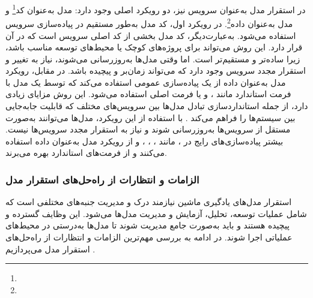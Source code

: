 در استقرار مدل به‌عنوان سرویس نیز، دو رویکرد اصلی وجود دارد: مدل به‌عنوان کد\footnote{} و مدل به‌عنوان داده\footnote{}. در رویکرد اول، کد مدل به‌طور مستقیم در پیاده‌سازی سرویس استفاده می‌شود. به‌عبارت‌دیگر، کد مدل بخشی از کد اصلی سرویس است که در آن قرار دارد. این روش می‌تواند برای پروژه‌های کوچک یا محیط‌های توسعه مناسب باشد، زیرا ساده‌تر و مستقیم‌تر است. اما وقتی مدل‌ها به‌روزرسانی می‌شوند، نیاز به تغییر و استقرار مجدد سرویس وجود دارد که می‌تواند زمان‌بر و پیچیده باشد. در مقابل، رویکرد مدل به‌عنوان داده از یک پیاده‌سازی عمومی استفاده می‌کند که توسط یک مدل با فرمت استاندارد مانند ،  و یا فرمت اصلی  استفاده می‌شود. این روش مزایای زیادی دارد، از جمله استانداردسازی تبادل مدل‌ها بین سرویس‌های مختلف که قابلیت جابه‌جایی بین سیستم‌ها را فراهم می‌کند \cite{kubeflowforML}. با استفاده از این رویکرد، مدل‌ها می‌توانند به‌صورت مستقل از سرویس‌ها به‌روزرسانی شوند و نیاز به استقرار مجدد سرویس‌ها نیست. بیشتر پیاده‌سازی‌های رایج در ، مانند ، ، ، و  از رویکرد مدل به‌عنوان داده استفاده می‌کنند و از فرمت‌های استاندارد بهره می‌برند.


\subsubsection{الزامات و انتظارات از راه‌حل‌های استقرار مدل}

استقرار مدل‌های یادگیری ماشین نیازمند درک و مدیریت جنبه‌های مختلفی است که شامل عملیات توسعه، تحلیل، آزمایش و مدیریت مدل‌ها می‌شود. این وظایف گسترده و پیچیده هستند و باید به‌صورت جامع مدیریت شوند تا مدل‌ها به‌درستی در محیط‌های عملیاتی اجرا شوند. در ادامه به بررسی مهم‌ترین الزامات و انتظارات از راه‌حل‌های استقرار مدل می‌پردازیم \cite{kubeflowforML}.

